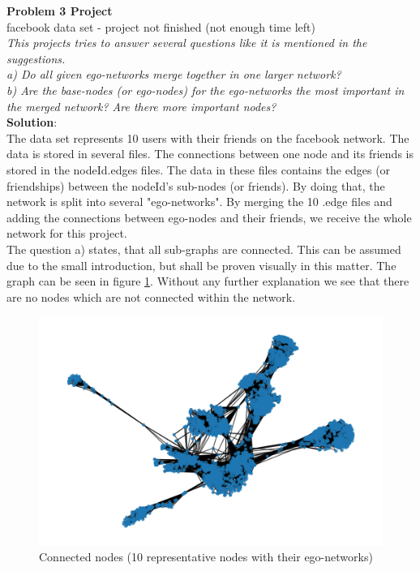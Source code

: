 \textbf{Problem 3 Project}\\
facebook data set - project not finished (not enough time left)\\
\textsl{This projects tries to answer several questions like it is mentioned in the suggestions.}\\
	\textsl{a) Do all given ego-networks merge together in one larger network?}\\
	\textsl{b) Are the base-nodes (or ego-nodes) for the ego-networks the most important in the merged network? Are there more important nodes?}\\

\textbf{Solution}:\\
The data set represents 10 users with their friends on the facebook network\cite{facebook_data}. The data is stored in several files. The connections between one node and its friends is stored in the nodeId.edges files. The data in these files contains the edges (or friendships) between the nodeId's sub-nodes (or friends). By doing that, the network is split into several "ego-networks". By merging the 10 .edge files and adding the connections between ego-nodes and their friends, we receive the whole network for this project.\\

The question a) states, that all sub-graphs are connected. This can be assumed due to the small introduction, but shall be proven visually in this matter. The graph can be seen in figure \ref{fig:facebook_network_global}. Without any further explanation we see that there are no nodes which are not connected within the network.\\

\begin{figure}[h]
	\centering
	\includegraphics[width=0.7\linewidth]{problem_03/facebook_network_global}
	\caption{Connected nodes (10 representative nodes with their ego-networks)}
	\label{fig:facebook_network_global}
\end{figure}

